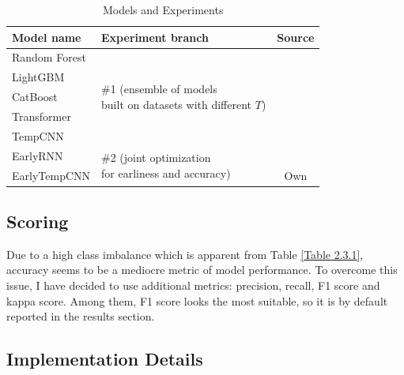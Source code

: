 \documentclass{article}
\begin{document}
\begin{table}
\centering
\caption{Models and Experiments}
\label{Table 3.2.1}
\begin{tabular}{l|l|c}
\toprule
Model name & Experiment branch & Source \\
\midrule
Random Forest & \multirow{5}{5cm}{\parbox{5cm}{\#1 (ensemble of models \\ built on datasets with different $T$)}} & \cite{ho1995random} \\
LightGBM  & & \cite{10.5555/3294996.3295074} \\
CatBoost & & \cite{dorogush2018catboost} \\
Transformer & & \cite{breizhcrops2020} \\
TempCNN & & \cite{breizhcrops2020} \\
\hline
EarlyRNN & \multirow{2}{5cm}{\parbox{5cm}{ \#2 (joint optimization \\ for earliness and accuracy)}} & \cite{rußwurm2022endtoend} \\
EarlyTempCNN & & Own \\
\bottomrule
\end{tabular}
\end{table}

\subsection{Scoring}

Due to a high class imbalance which is apparent from Table \ref{Table 2.3.1}, accuracy seems to be a mediocre metric of model performance. To overcome this issue, I have decided to use additional metrics: precision, recall, F1 score and kappa score. Among them, F1 score looks the most suitable, so it is by default reported in the results section.

\subsection{Implementation Details}
\end{document}
